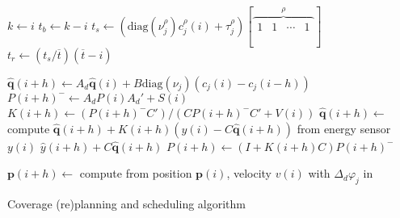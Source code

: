 \begin{algorithm}[h!]
{    {\normalsize $k\gets i$}\;\label{algo:repla:initbat}
    {\normalsize $t_b\gets k-i$}\;\label{algo:repla:endbat}%
    {\normalsize $t_s\gets(\mathrm{diag}(\nu_j^\rho)c_j^\rho(i)+\tau_j^\rho)[\overbrace{\begin{matrix}1&1&\cdots&1\end{matrix}}^{\rho}]$}\;\label{algo:repla:configtime}%
    {\normalsize $t_r\gets(t_s/\overline{t})(\overline{t}-i)$}\label{algo:repla:loosingmyreligiontime}\;%
    \vspace{1.6ex}

    {\normalsize $\hat{\mathbf{q}}(i+h)\gets A_d\hat{\mathbf{q}}(i)+B\mathrm{diag}{(\nu_j)}(c_j(i)-c_j(i-h))$}\;\label{algo:repla:sysevo}
    {\normalsize $P(i+h)^-\gets A_d P(i)A_d'+S(i)$}\;\label{algo:repla:covesterrorpri}
    {\normalsize $K(i+h)\gets (P(i+h)^-C')/(CP(i+h)^-C'+V(i))$}\;\label{algo:repla:goodoldkalmygains}
    {\normalsize $\hat{\mathbf{q}}(i+h)\gets${ \otherfont compute }$\hat{\mathbf{q}}(i+h)+K(i+h)(y(i)-C\hat{\mathbf{q}}(i+h))${ \otherfont from energy sensor }$y(i)$}\;\label{algo:repla:apoststate}
    {\normalsize $\hat{y}(i+h)+C\hat{\mathbf{q}}(i+h)$}\;
    {\normalsize $P(i+h)\gets (I+K(i+h)C)P(i+h)^-$}\;\label{algo:repla:endkalmy}
    \vspace{.8ex}
    
    {\normalsize $\mathbf{p}(i+h)\gets${ \otherfont compute from position }$\mathbf{p}(i)${\otherfont , velocity }\normalfont $v(i)${ \otherfont with }\normalfont $\Delta_d\varphi_j${ \otherfont in }}\;\label{algo:repla:gvf}
  }
  \vspace{1.6ex}

  \caption{Coverage (re)planning and scheduling algorithm}
  \label{algo:repla}
\end{algorithm}

